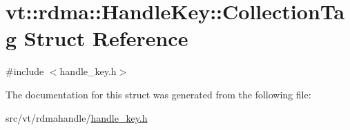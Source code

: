 \hypertarget{structvt_1_1rdma_1_1_handle_key_1_1_collection_tag}{}\section{vt\+:\+:rdma\+:\+:Handle\+Key\+:\+:Collection\+Tag Struct Reference}
\label{structvt_1_1rdma_1_1_handle_key_1_1_collection_tag}


{\ttfamily \#include $<$handle\+\_\+key.\+h$>$}



The documentation for this struct was generated from the following file\+:\begin{DoxyCompactItemize}
\item 
src/vt/rdmahandle/\hyperlink{handle__key_8h}{handle\+\_\+key.\+h}\end{DoxyCompactItemize}
